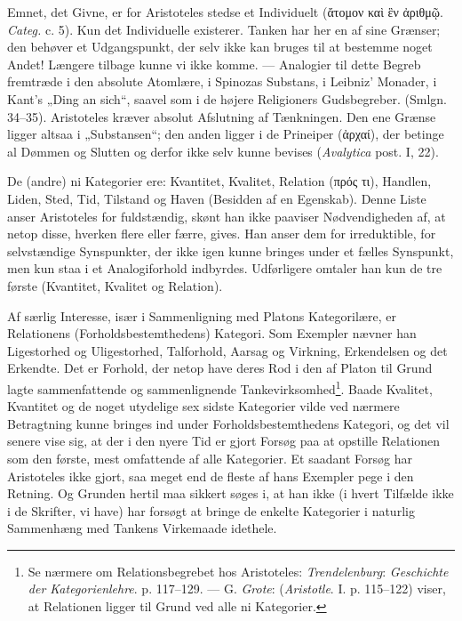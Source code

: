 \documentclass[12pt,a4paper]{book}
\newcommand{\apage}[1]{\marginnote{\footnotesize\textit{[#1]}}}
\begin{document}
Emnet, det Givne, er for Aristoteles stedse et Individuelt (ἄτομον καὶ ἓν
ἀριθμῷ. \emph{Categ.} c. 5). Kun det Individuelle existerer. Tanken har
her en af sine Grænser; den behøver et Udgangspunkt, der selv ikke kan
bruges til at bestemme noget Andet! Længere tilbage kunne vi ikke komme.
--- Analogier til dette Begreb fremtræde i den absolute Atomlære, i
Spinozas Substans, i Leibniz' Monader, i Kant's „Ding an sich“, saavel
som i de højere Religioners Gudsbegreber. (Smlgn. 34--35). Aristoteles
kræver absolut Afslutning af Tænkningen. Den ene Grænse ligger altsaa i
„Substansen“; den anden ligger i de Prineiper (ἀρχαί), der betinge al
Dømmen og Slutten og derfor ikke selv kunne bevises (\emph{Avalytica} post. I, 22).

De (andre) ni Kategorier ere: Kvantitet, Kvalitet, Relation (πρός τι),
Handlen, Liden, Sted, Tid, Tilstand og Haven (Besidden af en Egenskab).
Denne Liste anser Aristoteles for fuldstændig, skønt han ikke paaviser
Nødvendigheden af, at netop disse, hverken flere eller færre, gives. Han
anser dem for irreduktible, for selvstændige Synspunkter, der ikke igen
kunne bringes under et fælles Synspunkt, men kun staa i et
Analogiforhold indbyrdes. Udførligere omtaler han kun de tre første
(Kvantitet, Kvalitet og Relation).

Af særlig Interesse, især i Sammenligning med Platons Kategorilære, er
Relationens (Forholdsbestemthedens) Kategori. Som Exempler nævner han
Ligestorhed og Uligestorhed, Talforhold, Aarsag og Virkning, Erkendelsen
og det Erkendte. Det er Forhold, der netop have deres Rod i den af Platon
til Grund lagte sammenfattende og sammenlignende
Tankevirksomhed\footnote{Se nærmere om Relationsbegrebet hos Aristoteles:
\emph{Trendelenburg}: \emph{Geschichte der Kategorienlehre}. p. 117--129.
--- G. \emph{Grote}: (\emph{Aristotle}. I. p. 115--122) viser, at
Relationen ligger til Grund ved alle ni Kategorier.}. Baade Kvalitet, Kvantitet og de \apage{143} noget utydelige sex sidste Kategorier vilde ved nærmere Betragtning kunne
bringes ind under Forholdsbestemthedens Kategori, og det vil senere vise
sig, at der i den nyere Tid er gjort Forsøg paa at opstille Relationen som
den første, mest omfattende af alle Kategorier. Et saadant Forsøg har
Aristoteles ikke gjort, saa meget end de fleste af hans Exempler pege i
den Retning. Og Grunden hertil maa sikkert søges i, at han ikke (i hvert
Tilfælde ikke i de Skrifter, vi have) har forsøgt at bringe de enkelte
Kategorier i naturlig Sammenhæng med Tankens Virkemaade idethele.
\end{document}
